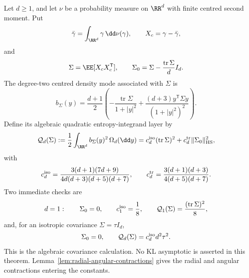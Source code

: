 \begin{theorem}%
\label{thm:multidim-covariance-algebra}
\label{prop:multidim-formal-covariance-layer}
Let \(d\ge1\), and let \(\nu\) be a probability measure on \(\RR^d\) with
finite centred second moment.  Put
\[
\bar{\gamma}=\int_{\RR^d}\gamma\,\dd\nu(\gamma),
\qquad
X_c=\gamma-\bar{\gamma},
\]
and
\[
\Sigma=\EE[X_cX_c^{\mathsf T}],\qquad
\Sigma_0=\Sigma-\frac{\operatorname{tr}\Sigma}{d}I_d.
\]
The degree-two centred density mode associated with \(\Sigma\) is
\begin{equation}\label{eq:multidim-leading-theorem-density-mode}
b_\Sigma(y)=
\frac{d+1}{2}\left(
-\frac{\operatorname{tr}\Sigma}{1+|y|^2}
+\frac{(d+3)y^{\mathsf T}\Sigma y}{(1+|y|^2)^2}
\right).
\end{equation}
Define its algebraic quadratic entropy-integrand layer by
\begin{equation}\label{eq:multidim-leading-positive-defect}
\mathcal Q_d(\Sigma)
:=\frac12\int_{\RR^d}b_\Sigma(y)^2\,\Omega_d(\dd y)
=c_d^{\rm iso}(\operatorname{tr}\Sigma)^2
+c_d^{\rm tr}\|\Sigma_0\|_{\rm HS}^2,
\end{equation}
with
\begin{equation}\label{eq:multidim-leading-positive-constants}
c_d^{\rm iso}=
\frac{3(d+1)(7d+9)}
{4d(d+3)(d+5)(d+7)},
\qquad
c_d^{\rm tr}=
\frac{3(d+1)(d+3)}
{4(d+5)(d+7)} .
\end{equation}
Two immediate checks are
\[
d=1:\qquad \Sigma_0=0,\qquad c_1^{\rm iso}=\frac18,\qquad
\mathcal Q_1(\Sigma)=\frac{(\operatorname{tr}\Sigma)^2}{8},
\]
and, for an isotropic covariance \(\Sigma=\tau I_d\),
\[
\Sigma_0=0,\qquad
\mathcal Q_d(\Sigma)=c_d^{\rm iso}d^2\tau^2 .
\]
This is the algebraic covariance calculation.  No KL asymptotic is asserted
in this theorem.  Lemma~\ref{lem:radial-angular-contractions} gives the radial
and angular contractions entering the constants.
\end{theorem}

